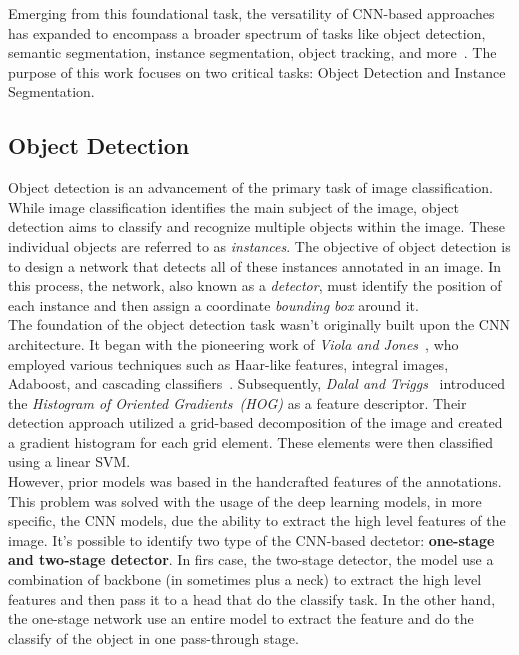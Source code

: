 Emerging from this foundational task, the versatility of CNN-based approaches has expanded to encompass a broader spectrum of tasks like object detection, semantic segmentation, instance segmentation, object tracking, and more~\cite{Zou2023, Zaidi2022}. The purpose of this work focuses on two critical tasks: Object Detection and Instance Segmentation.

\subsection{Object Detection}
Object detection is an advancement of the primary task of image classification. While image classification identifies the main subject of the image, object detection aims to classify and recognize multiple objects within the image. These individual objects are referred to as \textit{instances}. The objective of object detection is to design a network that detects all of these instances annotated in an image. In this process, the network, also known as a \textit{detector}, must identify the position of each instance and then assign a coordinate \textit{bounding box} around it.\\

The foundation of the object detection task wasn't originally built upon the CNN architecture. It began with the pioneering work of \textit{Viola and Jones}~\cite{Viola2004, 990517}, who employed various techniques such as Haar-like features, integral images, Adaboost, and cascading classifiers~\cite{Zaidi2022}. Subsequently, \textit{Dalal and Triggs}~\cite{1467360} introduced the \textit{Histogram of Oriented Gradients~(HOG)} as a feature descriptor. Their detection approach utilized a grid-based decomposition of the image and created a gradient histogram for each grid element. These elements were then classified using a linear SVM.\\

However, prior models was based in the handcrafted features of the annotations. This problem was solved with the usage of the deep learning models, in more specific, the CNN models, due the ability to extract the high level features of the image. It's possible to identify two type of the CNN-based dectetor: \textbf{one-stage and two-stage detector}. In firs case, the two-stage detector, the model use a combination of backbone (in sometimes plus a neck) to extract the high level features and then pass it to a head that do the classify task. In the other hand, the one-stage network use an entire model to extract the feature and do the classify of the object in one pass-through stage.\\

